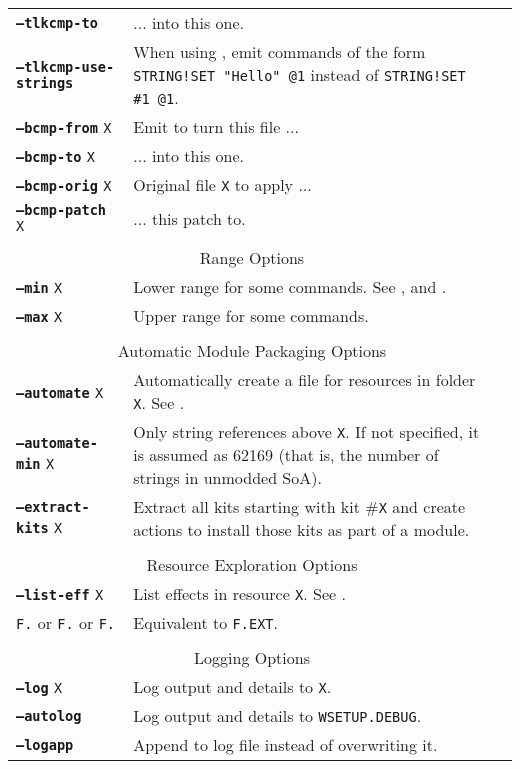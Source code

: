 \documentclass{article}
\def\ttref#1{\ahrefloc{#1}{\tt #1}}
\def\DEFINE#1{{\tt \bf #1}\label{#1}\index{#1}}
\def\t#1{{\tt #1}}
\begin{document}
\begin{tabular}{lp{10in}|p{10in}}
\DEFINE{--tlkcmp-to}\t{X}&	... into this one. \\
\DEFINE{--tlkcmp-use-strings} & When using \ttref{--tlkcmp-from}, emit
commands of the form \t{STRING!SET "Hello" @1} instead of \t{STRING!SET \#1
@1}. \\
\DEFINE{--bcmp-from}  \t{X}&      Emit \ttref{APPLY!BCS!PATCH} to turn this
\ttref{BCS} file ... \\
\DEFINE{--bcmp-to}    \t{X}&      ... into this one. \\
\DEFINE{--bcmp-orig}  \t{X}&      Original file \t{X} to apply ... \\
\DEFINE{--bcmp-patch} \t{X}&      ... this patch to. \\
\\
\multicolumn{2}{c}{ \color{red} Range Options} \\
\DEFINE{--min} \t{X} & Lower range for some commands. See
\ttref{--traify-tlk}, \ttref{--tlkcmp-from} and \ttref{--string}.  \\
\DEFINE{--max} \t{X} & Upper range for some commands. \\
\\
\multicolumn{2}{c}{ \color{red} Automatic Module Packaging Options} \\
\DEFINE{--automate} \t{X}&   Automatically create a \ttref{TP2} file for resources in folder \t{X}. See \ttref{--out}. \\
\DEFINE{--automate-min} \t{X}& Only \ttref{--automate} string references above \t{X}. If not specified, it is assumed as 62169 (that is, the number of strings in unmodded SoA). \\
\DEFINE{--extract-kits} \t{X} & Extract all kits starting with kit \#\t{X}
and create \ttref{TP2} actions to install those kits as part of a module.  \\
\\
\multicolumn{2}{c}{ \color{red} Resource Exploration Options } \\
\DEFINE{--list-eff} \t{X}&	List effects in resource \t{X}. See
\ttref{--out}. \\
{\tt F.}\ttref{ITM} or 
{\tt F.}\ttref{EFF} or 
\tt{F.}\ttref{SPL} & Equivalent to \ttref{--list-eff} \t{F.EXT}. \\
\\
\multicolumn{2}{c}{ \color{red} Logging Options } \\
\DEFINE{--log} \t{X}&	Log output and details to \t{X}. \\
\DEFINE{--autolog} & 	Log output and details to \t{WSETUP.DEBUG}. \\
\DEFINE{--logapp} & 	Append to log file instead of overwriting it. \\
\end{tabular}
\end{document}
